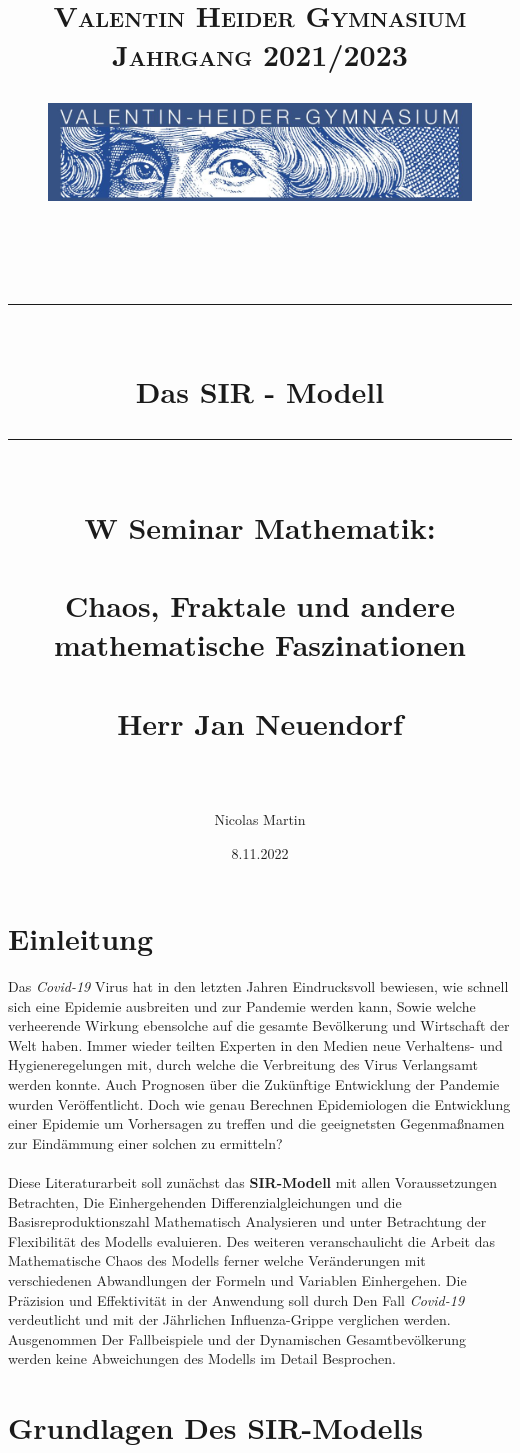 \documentclass[12pt]{scrartcl} %
\title{	
	\normalfont\normalsize
	\vspace{200pt}
	\textsc{Valentin Heider Gymnasium}\\
	\vspace{10pt}
	\textsc{Jahrgang 2021/2023}\\
	\begin{figure}[h] %
	\centering
	\includegraphics[width=0.5\columnwidth]{VHGLogo.jpg} 
	\end{figure}
	\vspace{25pt}\\
	
	\rule{\linewidth}{0.5pt}\\
	\vspace{20pt}
	{\huge Das SIR - Modell}\\
	\vspace{12pt}
	\rule{\linewidth}{2pt}\\
	\vspace{20pt}
	{\Large W Seminar Mathematik:}\\
	\vspace{12pt}\\
	{\Large Chaos, Fraktale und andere mathematische Faszinationen}\\
	\vspace{20pt}\\
	{\Large Herr Jan Neuendorf}\\
	\vspace{15pt}\\
}
\author{\LARGE Nicolas Martin}
\date{\normalsize 8.11.2022}
\begin{document}
\maketitle %
\thispagestyle{empty}
\newpage

\doublespacing
\tableofcontents
\thispagestyle{empty}
\cleardoublepage
\onehalfspacing
\newpage

\section{Einleitung}


Das \textsl{Covid-19} Virus hat in den letzten Jahren Eindrucksvoll bewiesen, wie schnell sich eine Epidemie ausbreiten und zur Pandemie werden kann,  
Sowie welche verheerende Wirkung ebensolche auf die gesamte Bevölkerung und Wirtschaft der Welt haben. 
Immer wieder teilten Experten in den Medien neue Verhaltens- und Hygieneregelungen mit, durch welche die Verbreitung des Virus Verlangsamt werden konnte. Auch Prognosen über die Zukünftige Entwicklung der Pandemie wurden Veröffentlicht. 
Doch wie genau Berechnen Epidemiologen die Entwicklung einer Epidemie um Vorhersagen zu treffen und die geeignetsten Gegenmaßnamen zur Eindämmung einer solchen zu ermitteln?\\
\\
Diese Literaturarbeit soll zunächst das \textbf{SIR-Modell} mit allen Voraussetzungen Betrachten, Die Einhergehenden Differenzialgleichungen und die Basisreproduktionszahl Mathematisch Analysieren und unter Betrachtung der Flexibilität des Modells evaluieren. 
Des weiteren veranschaulicht die Arbeit das Mathematische Chaos des Modells 
ferner welche Veränderungen mit verschiedenen Abwandlungen der Formeln und Variablen Einhergehen. 
Die Präzision und Effektivität in der Anwendung soll durch Den Fall \textsl{Covid-19} verdeutlicht und mit der Jährlichen Influenza-Grippe verglichen werden. 
Ausgenommen Der Fallbeispiele und der Dynamischen Gesamtbevölkerung werden keine Abweichungen des Modells im Detail Besprochen. 


\newpage
\section{Grundlagen Des SIR-Modells}
\end{document}
